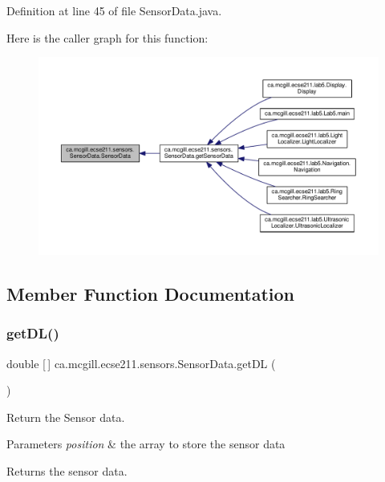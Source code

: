 Definition at line 45 of file Sensor\+Data.\+java.

Here is the caller graph for this function\+:
\nopagebreak
\begin{figure}[H]
\begin{center}
\leavevmode
\includegraphics[width=350pt]{classca_1_1mcgill_1_1ecse211_1_1sensors_1_1_sensor_data_a41b9929f62455a15364385a339b4b910_icgraph}
\end{center}
\end{figure}


\subsection{Member Function Documentation}
\mbox{\label{classca_1_1mcgill_1_1ecse211_1_1sensors_1_1_sensor_data_a4e0eabd547726c90bd0b7252557d7ad7}} 
\subsubsection{\texorpdfstring{get\+D\+L()}{getDL()}}
{\footnotesize\ttfamily double \mbox{[}$\,$\mbox{]} ca.\+mcgill.\+ecse211.\+sensors.\+Sensor\+Data.\+get\+DL (\begin{DoxyParamCaption}{ }\end{DoxyParamCaption})}

Return the Sensor data.


\begin{DoxyParams}{Parameters}
{\em position} & the array to store the sensor data \\
\hline
\end{DoxyParams}
\begin{DoxyReturn}{Returns}
the sensor data. 
\end{DoxyReturn}


